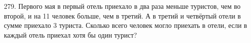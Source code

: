 279. Первого мая в первый отель приехало в два раза меньше туристов, чем во второй, и на 11 человек больше, чем в третий. А в третий и четвёртый отели в сумме приехало 3 туриста. Сколько всего человек могло приехать в отели, если в каждый отель приехал хотя бы один турист?\\
